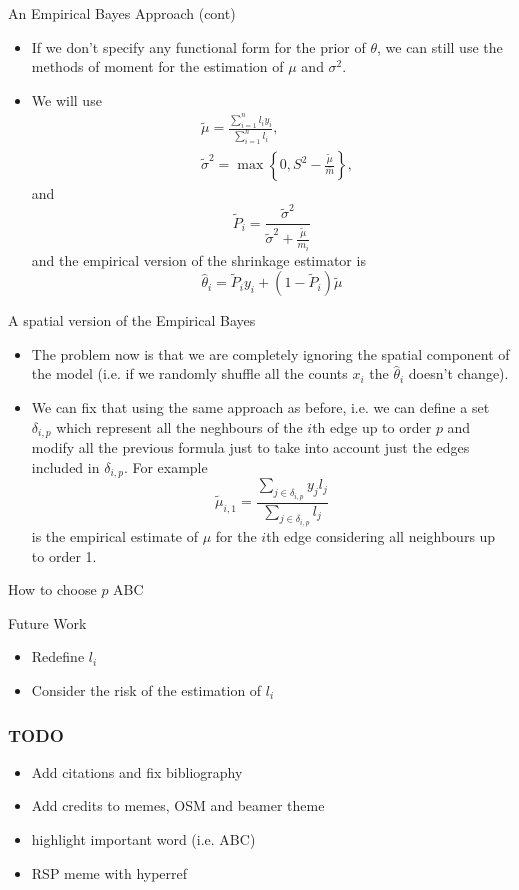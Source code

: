 \documentclass[c,10pt,pdftex]{beamer}
\begin{document}
\begin{frame}{An Empirical Bayes Approach (cont)}
\vspace{-0.75cm}
\begin{itemize}
	\setlength\itemsep{1em}
	\item If we don't specify any functional form for the prior of $\theta$, we can still use the methods of moment for the estimation of $\mu$ and $\sigma^2$. 
	
	\item We will use
	\[
	\begin{split}
		& \tilde{\mu} = \frac{\sum_{i=1}^{n} l_iy_i}{\sum_{i=1}^n l_i}, \\
		& \tilde{\sigma}^2 = \max\left\lbrace 0, S^2 - \frac{\tilde{\mu}}{\bar{m}}\right\rbrace,
	\end{split}
	\]
	and
	\[
	\tilde{P}_i = \frac{\tilde{\sigma}^2}{\tilde{\sigma}^2 + \frac{\tilde{\mu}}{m_i}} 
	\]
	and the empirical version of the shrinkage estimator is
	\[
	\hat{\theta}_i = \tilde{P}_iy_i + (1 - \tilde{P}_i)\tilde{\mu}
	\]
\end{itemize}
\end{frame}

\begin{frame}{A spatial version of the Empirical Bayes}
\vspace{-0.75cm}
\begin{itemize}
	\setlength\itemsep{1em}
	\item The problem now is that we are completely ignoring the spatial component of the model (i.e. if we randomly shuffle all the counts $x_i$ the $\hat{\theta}_i$ doesn't change). 
	
	\item We can fix that using the same approach as before, i.e. we can define a set $\delta_{i, p}$ which represent all the neghbours of the $i$th edge up to order $p$ and modify all the previous formula just to take into account just the edges included in $\delta_{i, p}$. For example
	\[
	\tilde{\mu}_{i, 1} = \frac{\sum_{j \in \delta_{i, p}} y_jl_j}{\sum_{j \in \delta_{i, p}} l_j}
	\]
	is the empirical estimate of $\mu$ for the $i$th edge considering all neighbours up to order 1. 
\end{itemize}
\end{frame}

\begin{frame}{How to choose $p$}
ABC
\end{frame}

\begin{frame}{Future Work}
\begin{itemize}
	\setlength\itemsep{1em}
	\item Redefine $l_i$
	\item Consider the risk of the estimation of $l_i$
\end{itemize}
\end{frame}

\begin{frame}
\frametitle{TODO}
\begin{itemize}
	\item Add citations and fix bibliography
	\item Add credits to memes, OSM and beamer theme
	\item highlight important word (i.e. \alert{ABC})
	\item RSP meme with hyperref
\end{itemize}
\end{frame}
\end{document}
